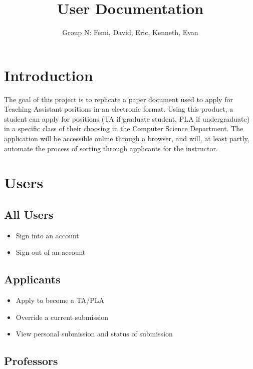 \documentclass[11pt]{amsart}
\title{User Documentation}
\author{Group N: Femi, David, Eric, Kenneth, Evan}
\begin{document}
\maketitle
\section{Introduction}
\noindent The goal of this project is to replicate a paper document used to apply for Teaching Assistant positions in an electronic format. Using this product, a student can apply for positions (TA if graduate student, PLA if undergraduate) in a specific class of their choosing in the Computer Science Department. The application will be accessible online through a browser, and will, at least partly, automate the process of sorting through applicants for the instructor.
\section{Users}


\subsection{All Users}

\begin{itemize}
    \item{Sign into an account}
    \item{Sign out of an account}
\end{itemize}

\subsection{Applicants}

\begin{itemize}
    \item{Apply to become a TA/PLA}
    \item{Override a current submission}
    \item{View personal submission and status of submission}
\end{itemize}

\subsection{Professors}
\end{document}
